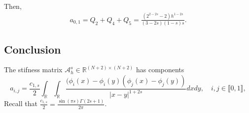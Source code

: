 \documentclass[11 pt]{article}
\newcommand\inter[1]{\llbracket #1\rrbracket}
\numberwithin{equation}{section}
\def\R{\mathbb{R}}
\begin{document}
Then,
\begin{align*}
a_{0,1}=Q_2+Q_4+Q_5=\frac{\left(2^{2-2 s}-2\right) h^{1-2 s}}{(3-2 s) (1-s) s}.
\end{align*}

\subsection{Conclusion}

The stifness matrix $\mathcal A_h^s\in\mathbb R^{(N+2)\times (N+2)}$ has components
%
\begin{equation}\label{eq:def_aijs_s}
a_{i,j}=\frac{c_{1,s}}{2}\int_{\R}\int_{\R}\frac{(\phi_i(x)-\phi_i(y)(\phi_j(x)-\phi_j(y))}{|x-y|^{1+2s}}dx dy, \quad i,j\in\inter{0,1}, 
\end{equation}
Recall that $\frac{c_{1,s}}{2}=\frac{\sin (\pi  s) \Gamma (2 s+1)}{2\pi}$.
\end{document}
